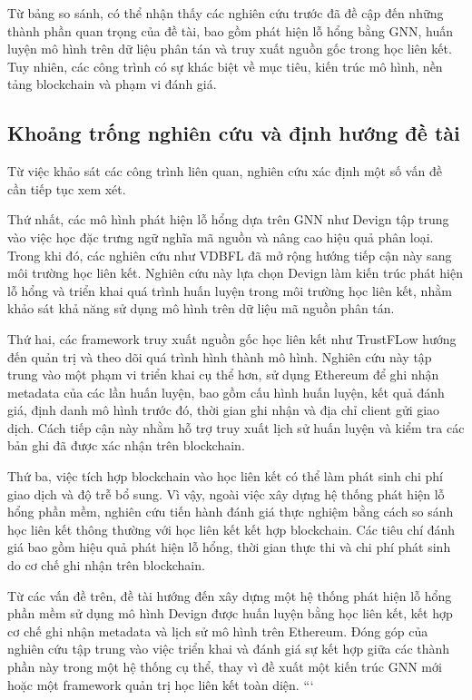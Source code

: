 Từ bảng so sánh, có thể nhận thấy các nghiên cứu trước đã đề cập đến những thành phần quan trọng
của đề tài, bao gồm phát hiện lỗ hổng bằng GNN, huấn luyện mô hình trên dữ liệu phân tán và truy
xuất nguồn gốc trong học liên kết. Tuy nhiên, các công trình có sự khác biệt về mục tiêu, kiến trúc
mô hình, nền tảng blockchain và phạm vi đánh giá.

\subsection{Khoảng trống nghiên cứu và định hướng đề tài}

Từ việc khảo sát các công trình liên quan, nghiên cứu xác định một số vấn đề cần tiếp tục xem xét.

Thứ nhất, các mô hình phát hiện lỗ hổng dựa trên GNN như Devign tập trung vào việc học đặc trưng
ngữ nghĩa mã nguồn và nâng cao hiệu quả phân loại. Trong khi đó, các nghiên cứu như VDBFL đã mở
rộng hướng tiếp cận này sang môi trường học liên kết. Nghiên cứu này lựa chọn Devign làm kiến trúc
phát hiện lỗ hổng và triển khai quá trình huấn luyện trong môi trường học liên kết, nhằm khảo sát
khả năng sử dụng mô hình trên dữ liệu mã nguồn phân tán.

Thứ hai, các framework truy xuất nguồn gốc học liên kết như TrustFLow hướng đến quản trị và theo
dõi quá trình hình thành mô hình. Nghiên cứu này tập trung vào một phạm vi triển khai cụ thể hơn,
sử dụng Ethereum để ghi nhận metadata của các lần huấn luyện, bao gồm cấu hình huấn luyện, kết quả
đánh giá, định danh mô hình trước đó, thời gian ghi nhận và địa chỉ client gửi giao dịch. Cách tiếp
cận này nhằm hỗ trợ truy xuất lịch sử huấn luyện và kiểm tra các bản ghi đã được xác nhận trên
blockchain.

Thứ ba, việc tích hợp blockchain vào học liên kết có thể làm phát sinh chi phí giao dịch và độ trễ
bổ sung. Vì vậy, ngoài việc xây dựng hệ thống phát hiện lỗ hổng phần mềm, nghiên cứu tiến hành đánh
giá thực nghiệm bằng cách so sánh học liên kết thông thường với học liên kết kết hợp blockchain.
Các tiêu chí đánh giá bao gồm hiệu quả phát hiện lỗ hổng, thời gian thực thi và chi phí phát sinh
do cơ chế ghi nhận trên blockchain.

Từ các vấn đề trên, đề tài hướng đến xây dựng một hệ thống phát hiện lỗ hổng phần mềm sử dụng mô
hình Devign được huấn luyện bằng học liên kết, kết hợp cơ chế ghi nhận metadata và lịch sử mô hình
trên Ethereum. Đóng góp của nghiên cứu tập trung vào việc triển khai và đánh giá sự kết hợp giữa
các thành phần này trong một hệ thống cụ thể, thay vì đề xuất một kiến trúc GNN mới hoặc một
framework quản trị học liên kết toàn diện. ```
